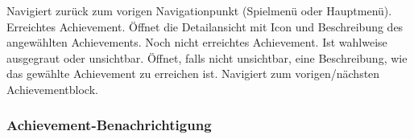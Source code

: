 \begin{center}
\setlength\fboxsep{20pt}
\setlength\fboxrule{1pt}
\end{center}

\begin{requirements}
 Navigiert zurück zum vorigen Navigationpunkt (Spielmenü oder Hauptmenü).
 Erreichtes Achievement. Öffnet die Detailansicht mit Icon und Beschreibung des angewählten Achievements.
 Noch nicht erreichtes Achievement. Ist wahlweise ausgegraut oder unsichtbar. Öffnet, falls nicht unsichtbar, eine Beschreibung, wie das gewählte Achievement zu erreichen ist.
 Navigiert zum vorigen/nächsten Achievementblock.
\end{requirements}

\subsubsection{Achievement-Benachrichtigung}

\begin{center}
\setlength\fboxsep{20pt}
\setlength\fboxrule{1pt}
\end{center}

